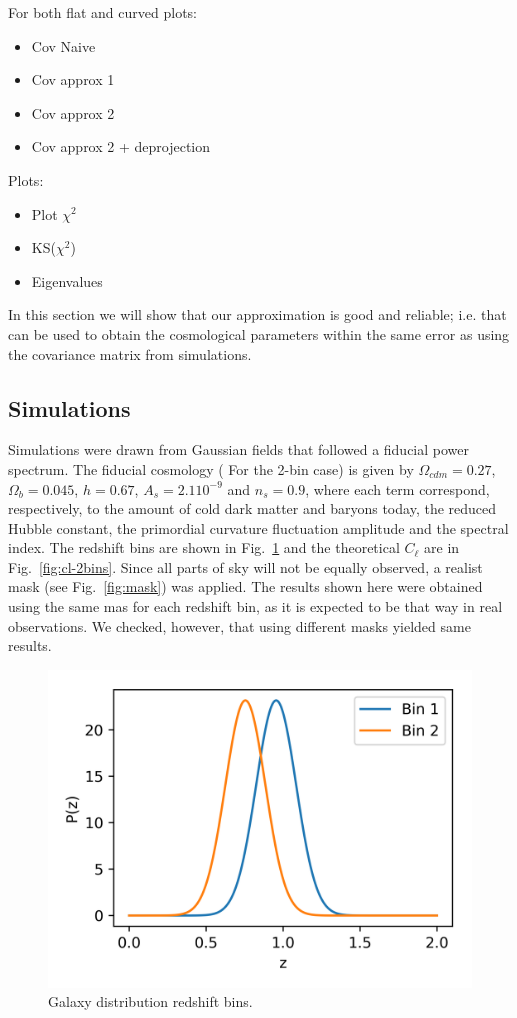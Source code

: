 \documentclass[useAMS,usenatbib]{mn2e}
\newcommand{\cl}{C_\ell}
\newcommand{\red}[1]{{\color{red} #1}}
\begin{document}
For both flat and curved plots:
\begin{itemize}
\item Cov Naive
\item Cov approx 1
\item Cov approx 2
\item Cov approx 2 + deprojection
\end{itemize}

Plots:
\begin{itemize}
\item Plot $\chi^2$
\item KS($\chi^2$)
\item Eigenvalues
\end{itemize}

In this section we will show that our approximation is good and reliable; i.e.
that can be used to obtain the cosmological parameters within the same error
as using the covariance matrix from simulations. 

\subsection{Simulations}

Simulations were drawn from Gaussian fields that followed a fiducial power
spectrum. The fiducial cosmology (\red{For the 2-bin case}) is given by
$\Omega_{cdm} = 0.27$, $\Omega_b = 0.045$, $h = 0.67$, $A_s = 2.1 10^{-9}$ and
$n_s = 0.9$, where each term correspond, respectively, to the amount of cold
dark matter and baryons today, the reduced Hubble constant, the primordial
curvature fluctuation amplitude and the spectral index. The redshift bins are
shown in Fig.~\ref{fig:pz} and the theoretical $\cl$ are in
Fig.~\ref{fig:cl-2bins}. Since all parts of sky will not be equally observed, a
realist mask (see Fig.~\ref{fig:mask}) was applied.  The results shown here
were obtained using the same mas for each redshift bin, as it is expected to
be that way in real observations. We checked, however, that using different
masks yielded same results. 

\begin{figure}
  \centering
  \includegraphics[width=\columnwidth]{./figures/pz.png}
  \caption{Galaxy distribution redshift bins.}
  \label{fig:pz}
\end{figure}
\end{document}
